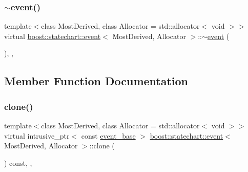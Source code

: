 \mbox{\label{classboost_1_1statechart_1_1event_a9b02006f65d2536a90c68feae6b23c76}} 
\subsubsection{\texorpdfstring{$\sim$event()}{~event()}}
{\footnotesize\ttfamily template$<$class Most\+Derived, class Allocator = std\+::allocator$<$ void $>$$>$ \\
virtual \mbox{\hyperlink{classboost_1_1statechart_1_1event}{boost\+::statechart\+::event}}$<$ Most\+Derived, Allocator $>$\+::$\sim$\mbox{\hyperlink{classboost_1_1statechart_1_1event}{event}} (\begin{DoxyParamCaption}{ }\end{DoxyParamCaption})\hspace{0.3cm}{\ttfamily [inline]}, {\ttfamily [protected]}, {\ttfamily [virtual]}}



\subsection{Member Function Documentation}
\mbox{\label{classboost_1_1statechart_1_1event_ad7e8221cf71f8513075e29a64b9ad5b6}} 
\subsubsection{\texorpdfstring{clone()}{clone()}}
{\footnotesize\ttfamily template$<$class Most\+Derived, class Allocator = std\+::allocator$<$ void $>$$>$ \\
virtual intrusive\+\_\+ptr$<$ const \mbox{\hyperlink{classboost_1_1statechart_1_1event__base}{event\+\_\+base}} $>$ \mbox{\hyperlink{classboost_1_1statechart_1_1event}{boost\+::statechart\+::event}}$<$ Most\+Derived, Allocator $>$\+::clone (\begin{DoxyParamCaption}{ }\end{DoxyParamCaption}) const\hspace{0.3cm}{\ttfamily [inline]}, {\ttfamily [private]}, {\ttfamily [virtual]}}



